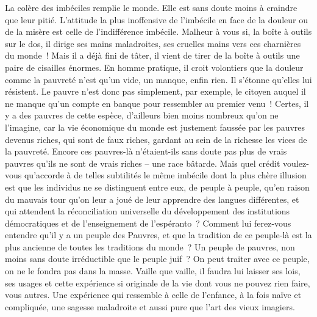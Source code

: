 \documentclass[french,twoside]{book} %
\begin{document}
La colère des imbéciles remplie le monde. Elle est sans doute moins à craindre que leur pitié. L’attitude la plus inoffensive de l’imbécile en face de la douleur ou de la misère est celle de l’indifférence imbécile. Malheur à vous si, la boîte à outils sur le dos, il dirige ses mains maladroites, ses cruelles mains vers ces charnières du monde ! Mais il a déjà fini de tâter, il vient de tirer de la boîte à outils une paire de cisailles énormes. En homme pratique, il croit volontiers que la douleur comme la pauvreté n’est qu’un vide, un manque, enfin rien. Il s’étonne qu’elles lui résistent. Le pauvre n’est donc pas simplement, par exemple, le citoyen auquel il ne manque qu’un compte en banque pour ressembler au premier venu ! Certes, il y a des pauvres de cette espèce, d’ailleurs bien moins nombreux qu’on ne l’imagine, car la vie économique du monde est justement faussée par les pauvres devenus riches, qui sont de faux riches, gardant au sein de la richesse les vices de la pauvreté. Encore ces pauvres-là n’étaient-ils sans doute pas plus de vrais pauvres qu’ils ne sont de vrais riches – une race bâtarde. Mais quel crédit voulez-vous qu’accorde à de telles subtilités le même imbécile dont la plus chère illusion est que les individus ne se distinguent entre eux, de peuple à peuple, qu’en raison du mauvais tour qu’on leur a joué de leur apprendre des langues différentes, et qui attendent la réconciliation universelle du développement des institutions démocratiques et de l’enseignement de l’espéranto ? Comment lui ferez-vous entendre qu’il y a un peuple des Pauvres, et que la tradition de ce peuple-là est la plus ancienne de toutes les traditions du monde ? Un peuple de pauvres, non moins sans doute irréductible que le peuple juif ? On peut traiter avec ce peuple, on ne le fondra pas dans la masse. Vaille que vaille, il faudra lui laisser ses lois, ses usages et cette expérience si originale de la vie dont vous ne pouvez rien faire, vous autres. Une expérience qui ressemble à celle de l’enfance, à la fois naïve et compliquée, une sagesse maladroite et aussi pure que l’art des vieux imagiers.\par
\end{document}
